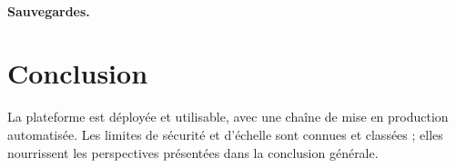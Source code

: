 \paragraph{Sauvegardes.} 

\section{Conclusion}
La plateforme est déployée et utilisable, avec une chaîne de mise en production automatisée. Les limites de sécurité et d'échelle sont connues et classées ; elles nourrissent les perspectives présentées dans la conclusion générale.
